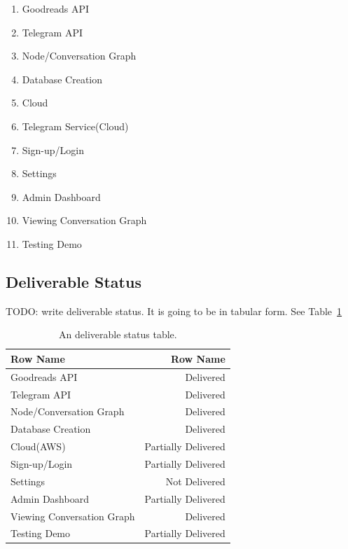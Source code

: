 \documentclass[a4paper]{article}
\begin{document}
\begin{enumerate}

   \item  Goodreads API
   
   \item  Telegram API  
     
   \item  Node/Conversation Graph
    
   \item Database Creation  
   
  \item   Cloud
  
  \item Telegram Service(Cloud)

   
  \item   Sign-up/Login
  
  \item   Settings
  
  \item Admin Dashboard
  
    \item Viewing Conversation Graph
      \item Testing Demo  
      
 \end{enumerate}

\subsection{Deliverable Status}
TODO: write deliverable status. It is going to be in tabular form. See Table~\ref{tab:deliverablestatus}

\begin{table}
\centering
\begin{tabular}{l|r}
Row Name & Row Name \\\hline
Goodreads API & Delivered \\
Telegram API & Delivered \\
Node/Conversation Graph & Delivered \\
Database Creation  & Delivered \\
Cloud(AWS) & Partially Delivered \\
Sign-up/Login & Partially Delivered \\
Settings & Not Delivered\\
Admin Dashboard & Partially Delivered \\
Viewing Conversation Graph & Delivered \\
Testing Demo & Partially Delivered
\end{tabular}
\caption{\label{tab:deliverablestatus}An deliverable status table.}
\end{table}
\end{document}
